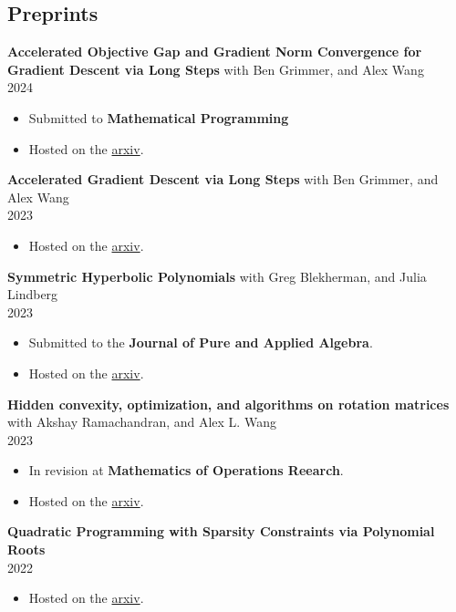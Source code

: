 \documentclass[margin]{res}
\begin{document}
\begin{resume}
\section{Preprints}
{\bf  Accelerated Objective Gap and Gradient Norm Convergence for Gradient Descent via Long Steps} with Ben Grimmer, and Alex Wang \\ 2024
\begin{itemize} \itemsep -2pt %
\item Submitted to \textbf{Mathematical Programming}
\item Hosted on the \href{https://arxiv.org/abs/2403.14045}{arxiv}.
\end{itemize}

{\bf  Accelerated Gradient Descent via Long Steps} with Ben Grimmer, and Alex Wang \\ 2023
\begin{itemize} \itemsep -2pt %
\item Hosted on the \href{https://arxiv.org/abs/2309.09961}{arxiv}.
\end{itemize}


{\bf  Symmetric Hyperbolic Polynomials} with Greg Blekherman, and Julia Lindberg \\ 2023
\begin{itemize} \itemsep -2pt %
\item Submitted to the \textbf{Journal of Pure and Applied Algebra}.
\item Hosted on the \href{https://arxiv.org/abs/2308.09653}{arxiv}.
\end{itemize}

{\bf  Hidden convexity, optimization, and algorithms on rotation matrices  } with Akshay Ramachandran, and Alex L. Wang\\ 2023
\begin{itemize} \itemsep -2pt %
\item In revision at \textbf{Mathematics of Operations Reearch}.
\item Hosted on the \href{https://arxiv.org/abs/2304.08596}{arxiv}.
\end{itemize}
{\bf  Quadratic Programming with Sparsity Constraints via Polynomial Roots } \\ 2022
\begin{itemize} \itemsep -2pt %
\item Hosted on the \href{https://arxiv.org/abs/2208.11143}{arxiv}.
\end{itemize}


\end{resume}
\end{document}
